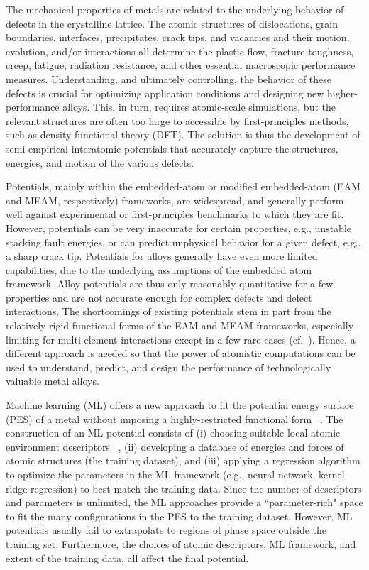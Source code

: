 \documentclass{article}
\begin{document}
The mechanical properties of metals are related to the underlying behavior of defects in the crystalline lattice. The atomic structures of dislocations, grain boundaries, interfaces, precipitates, crack tips, and vacancies and their motion, evolution, and/or interactions all determine the plastic flow, fracture toughness, creep, fatigue, radiation resistance, and other essential macroscopic performance measures.   Understanding, and ultimately controlling, the behavior of these defects is crucial for optimizing application conditions and designing new higher-performance alloys.  This, in turn, requires atomic-scale simulations, but the relevant structures are often too large to accessible by first-principles methods, such as density-functional theory (DFT). The solution is thus the development of semi-empirical interatomic potentials that accurately capture the structures, energies, and motion of the various defects.

Potentials, mainly within the embedded-atom or modified embedded-atom (EAM and MEAM, respectively) frameworks, are widespread, and generally perform well against experimental or first-principles benchmarks to which they are fit.
However, potentials can be very inaccurate for certain properties, e.g., unstable stacking fault energies, or can predict unphysical behavior for a given defect, e.g., a sharp crack tip.
Potentials for alloys generally have even more limited capabilities, due to the underlying assumptions of the embedded atom framework.  Alloy potentials are thus only reasonably quantitative for a few properties and are not accurate enough for complex defects and defect interactions.
The shortcomings of existing potentials stem in part from the relatively rigid functional forms of the EAM and MEAM frameworks, especially limiting for multi-element interactions except in a few rare cases (cf.~\cite{Juslin2005AnalyticalSystem}).
Hence, a different approach is needed so that the power of atomistic computations can be used to understand, predict, and design the performance of technologically valuable metal alloys.

Machine learning (ML) offers a new approach to fit the potential energy surface (PES)
of a metal without imposing a highly-restricted functional form ~\cite{Bartok2013,Behler2015,Kobayashi2017,PurjaPun0PhysicallyMaterials,Wang2018}.
The construction of an ML potential consists of (i) choosing suitable local atomic environment descriptors ~\cite{Behler2007,Rogers2010Extended-connectivityFingerprints,Bartok2015,Faber2017PredictionError}, (ii) developing a database of energies and forces of atomic structures (the training dataset), and (iii) applying a regression algorithm to optimize the parameters in the ML framework (e.g., neural network, kernel ridge regression) to best-match the training data.
Since the number of descriptors and parameters is unlimited, the ML approaches provide a ``parameter-rich" space to fit the many configurations in the PES to the training dataset.
However, ML potentials usually fail to extrapolate to regions of phase space outside the training set. Furthermore, the choices of atomic descriptors, ML framework, and extent of the training data, all affect the final potential.
\end{document}
